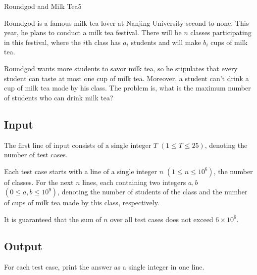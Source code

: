 \begin{Problem}{Roundgod and Milk Tea}{5}

Roundgod is a famous milk tea lover at Nanjing University second to none. This year, he plans to conduct a milk tea festival. There will be $n$ classes participating in this festival, where the $i$th class has $a_i$ students and will make $b_i$ cups of milk tea.

Roundgod wants more students to savor milk tea, so he stipulates that every student can taste at most one cup of milk tea. Moreover, a student can't drink a cup of milk tea made by his class. The problem is, what is the maximum number of students who can drink milk tea?

\subsection*{Input}

The first line of input consists of a single integer $T$ $(1 \leq T \leq 25)$, denoting the number of test cases.

Each test case starts with a line of a single integer $n$ $(1 \leq n \leq 10^6)$, the number of classes. For the next $n$ lines, each containing two integers $a, b$ $(0 \leq a, b \leq 10^9)$, denoting the number of students of the class and the number of cups of milk tea made by this class, respectively.

It is guaranteed that the sum of $n$ over all test cases does not exceed $6 \times 10^6$.

\subsection*{Output}

For each test case, print the answer as a single integer in one line.


\end{Problem}
